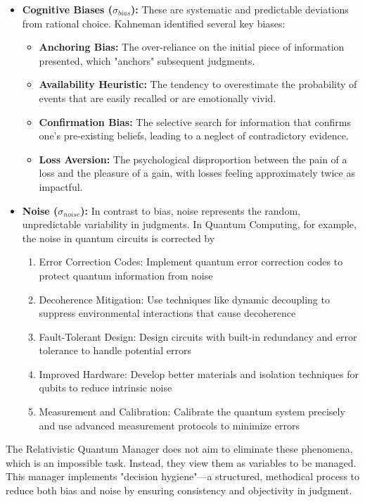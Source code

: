 \documentclass{article}
\begin{document}
\begin{itemize}
    \item \textbf{Cognitive Biases ($\sigma_{bias}$):} These are systematic and predictable deviations from rational choice. Kahneman identified several key biases:
    \begin{itemize}
        \item \textbf{Anchoring Bias:} The over-reliance on the initial piece of information presented, which "anchors" subsequent judgments.
        \item \textbf{Availability Heuristic:} The tendency to overestimate the probability of events that are easily recalled or are emotionally vivid.
        \item \textbf{Confirmation Bias:} The selective search for information that confirms one's pre-existing beliefs, leading to a neglect of contradictory evidence.
        \item \textbf{Loss Aversion:} The psychological disproportion between the pain of a loss and the pleasure of a gain, with losses feeling approximately twice as impactful.
    \end{itemize}
    \item \textbf{Noise ($\sigma_{noise}$):} In contrast to bias, noise represents the random, unpredictable variability in judgments. In Quantum Computing, for example, the noise in quantum circuits is corrected by
\begin{enumerate}
    \item Error Correction Codes: Implement quantum error correction codes to protect quantum information from noise
    \item Decoherence Mitigation: Use techniques like dynamic decoupling to suppress environmental interactions that cause decoherence
    \item Fault-Tolerant Design: Design circuits with built-in redundancy and error tolerance to handle potential errors
    \item Improved Hardware: Develop better materials and isolation techniques for qubits to reduce intrinsic noise
    \item Measurement and Calibration: Calibrate the quantum system precisely and use advanced measurement protocols to minimize errors
\end{enumerate}
\end{itemize}

The Relativistic Quantum Manager does not aim to eliminate these phenomena, which is an impossible task. Instead, they view them as variables to be managed. This manager implements "decision hygiene"—a structured, methodical process to reduce both bias and noise by ensuring consistency and objectivity in judgment.
\end{document}
